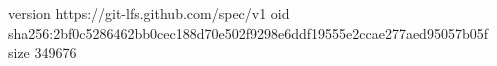 version https://git-lfs.github.com/spec/v1
oid sha256:2bf0c5286462bb0cec188d70e502f9298e6ddf19555e2ccae277aed95057b05f
size 349676
